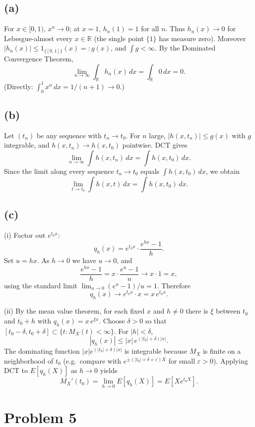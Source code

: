 \documentclass[11pt]{article}
\begin{document}
\subsection*{(a)}

For $x\in[0,1)$, $x^n\to 0$; at $x=1$, $h_n(1)=1$ for all $n$. Thus $h_n(x)\to 0$ for Lebesgue-almost every $x\in\mathbb{R}$ (the single point $\{1\}$ has measure zero). Moreover $|h_n(x)|\le 1_{\{[0,1]\}}(x)=:g(x)$, and $\int g<\infty$. By the Dominated Convergence Theorem,
\[
\lim_{n\to\infty}\int_{\mathbb{R}} h_n(x)\,dx
= \int_{\mathbb{R}} 0\,dx = 0.
\]
(Directly: $\int_0^1 x^n\,dx=1/(n+1)\to 0$.)

\subsection*{(b)}

Let $(t_n)$ be any sequence with $t_n\to t_0$. For $n$ large, $|h(x,t_n)|\le g(x)$ with $g$ integrable, and $h(x,t_n)\to h(x,t_0)$ pointwise. DCT gives
\[
\lim_{n\to\infty}\int h(x,t_n)\,dx=\int h(x,t_0)\,dx.
\]
Since the limit along every sequence $t_n\to t_0$ equals $\int h(x,t_0)\,dx$, we obtain
\[
\lim_{t\to t_0}\int h(x,t)\,dx=\int h(x,t_0)\,dx.
\]

\subsection*{(c)}

(i) Factor out $e^{t_0 x}$:
\[
q_h(x)=e^{t_0 x}\cdot\frac{e^{hx}-1}{h}.
\]
Set $u=hx$. As $h\to 0$ we have $u\to 0$, and
\[
\frac{e^{hx}-1}{h}=x\cdot\frac{e^u-1}{u}\to x\cdot 1=x,
\]
using the standard limit $\lim_{u\to 0}(e^u-1)/u=1$. Therefore
\[
q_h(x)\to e^{t_0 x}\cdot x=x\,e^{t_0 x}.
\]

(ii) By the mean value theorem, for each fixed $x$ and $h\neq 0$ there is $\xi$ between $t_0$ and $t_0+h$ with $q_h(x)=x\,e^{\xi x}$. Choose $\delta>0$ so that $[t_0-\delta,t_0+\delta]\subset\{t:M_X(t)<\infty\}$. For $|h|<\delta$,
\[
|q_h(x)|\le |x|\,e^{(|t_0|+\delta)|x|}.
\]
The dominating function $|x|e^{(|t_0|+\delta)|x|}$ is integrable because $M_X$ is finite on a neighborhood of $t_0$ (e.g.\ compare with $e^{\pm(|t_0|+\delta+\varepsilon)X}$ for small $\varepsilon>0$). Applying DCT to $E[q_h(X)]$ as $h\to 0$ yields
\[
M_X'(t_0)=\lim_{h\to 0}E[q_h(X)]=E[X e^{t_0 X}].
\]

\section*{Problem 5}
\end{document}
